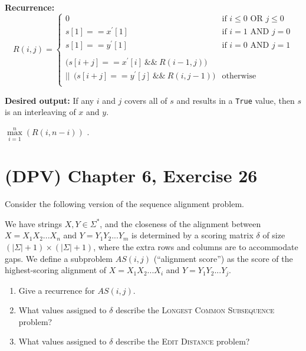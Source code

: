 \documentclass[12pt, letterpaper]{article}
\begin{document}
\vspace{5mm}
\noindent\textbf{Recurrence:}
\begin{equation*}
    R(i, j) = 
    \begin{cases}
    0 & \text{if } i \leq 0 \text{  OR  } j \leq 0 \\
    s[1] == x^\prime [1] & \text{if } i = 1 \text{  AND  } j = 0 \\
    s[1] == y^\prime [1] & \text{if } i = 0 \text{  AND  } j = 1 \\
    &\\
    \big( s[i+j] == x^\prime [i] \ \&\&\  R(i-1, j) \big) \ \  &\\
    || \ \  \big( s[i+j] == y^\prime [j] \ \&\&\  R(i, j-1) \big) & \text{otherwise} \\
    \end{cases}
\end{equation*}

\vspace{5mm}
\noindent\textbf{Desired output:}
If any $i$ and $j$ covers all of $s$ and results in a \verb|True| value, then $s$ is an interleaving of $x$ and $y$.

$\max\limits_{i=1}^{n}{(R(i, n-i))}$ .

\clearpage
\section{(DPV) Chapter 6, Exercise 26}
Consider the following version of the sequence alignment problem. 

\noindent We have strings $X, Y \in \Sigma^{*}$, and the closeness of the alignment between $X = X_1 X_2 ... X_n$ and $Y = Y_1 Y_2 ... Y_m$ is determined by a scoring matrix $\delta$ of size $(|\Sigma| + 1) \times (|\Sigma| + 1)$, where the extra rows and columns are to accommodate gaps. 
We define a subproblem $AS(i,j)$ (``alignment score'') as the score of the highest-scoring alignment of $X = X_1 X_2 ... X_i$ and $Y = Y_1 Y_2 ... Y_j$.

\renewcommand{\theenumi}{\alph{enumi}}
\begin{enumerate}
    \item Give a recurrence for $AS(i,j)$.
    \item What values assigned to $\delta$ describe the \textsc{Longest Common Subsequence} problem?
    \item What values assigned to $\delta$ describe the \textsc{Edit Distance} problem?
\end{enumerate}
\renewcommand{\theenumi}{\arabic{enumi}}
\end{document}
